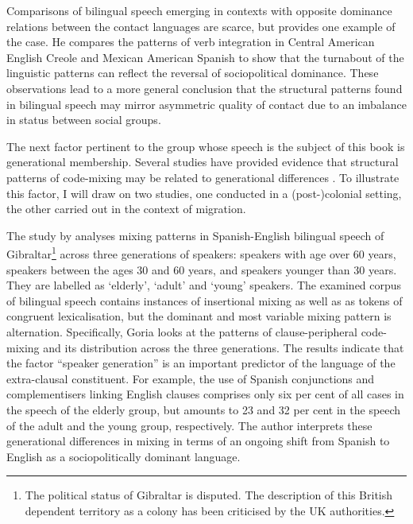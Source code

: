 \noindent Comparisons of bilingual speech emerging in contexts with opposite dominance relations between the contact languages are scarce, but \citet[][223--224]{muysken-bilingual-2000} provides one example of the case. He compares the patterns of verb integration in Central American English Creole \citep[based  on][]{herzfeld-80, herzfeld-83} and Mexican American Spanish \citep[based on][]{pfaff-1979} to show that the turnabout of the linguistic patterns can reflect the reversal of sociopolitical dominance. These observations lead to a more general conclusion that the structural patterns found in bilingual speech may mirror asymmetric quality of contact due to an imbalance in status between social groups.

The next factor pertinent to the group whose speech is the subject of this book is generational membership. Several studies have provided evidence that structural patterns of code-mixing may be related to generational differences \citep[for a review, see][224--227]{muysken-bilingual-2000}. To illustrate this factor, I will draw on two studies, one conducted in a (post-)colonial setting, the other carried out in the context of migration. 

The study by \citet{goria-road} analyses mixing patterns in Spanish-English bilingual speech of Gibraltar\footnote{The political status of Gibraltar is disputed. The description of this British dependent territory as a colony has been criticised by the UK authorities.} across three generations of speakers: speakers with age over 60 years, speakers between the ages 30 and 60 years, and speakers younger than 30 years. They are labelled as `elderly', `adult' and `young' speakers. The examined corpus of bilingual speech contains instances of insertional mixing as well as as tokens of congruent lexicalisation, but the dominant and most variable mixing pattern is alternation. Specifically, Goria looks at the patterns of clause-peripheral code-mixing and its distribution across the three generations. The results indicate that the factor ``speaker generation'' is an important predictor of the language of the extra-clausal constituent. For example, the use of Spanish conjunctions and complementisers linking English clauses comprises only six per cent of all cases in the speech of the elderly group, but amounts to 23 and 32 per cent in the speech of the adult and the young group, respectively. The author interprets these generational differences in mixing in terms of an ongoing shift from Spanish to English as a sociopolitically dominant language.

